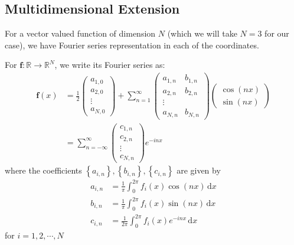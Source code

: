 \documentclass[a4paper]{article}
\theoremstyle{definition}
\newcommand{\dx}{\, \text{d} x}
\begin{document}
\subsection{Multidimensional Extension}
For a vector valued function of dimension $N$ (which we will take $N=3$ for our case), we have Fourier series representation in each of the coordinates.

For $\mathbf{f}:\mathbb{R} \rightarrow \mathbb{R}^N$, we write its Fourier series as:
\begin{align}
    \mathbf{f} (x) &= \frac{1}{2}
    \begin{pmatrix}
        a_{1,0} \\
        a_{2,0} \\
        \vdots \\
        a_{N,0}
    \end{pmatrix}
    + \sum_{n=1}^\infty
    \begin{pmatrix}
        a_{1,n} & b_{1,n} \\
        a_{2,n} & b_{2,n} \\
        \vdots \\
        a_{N,n} & b_{N,n}
    \end{pmatrix}
    \begin{pmatrix}
        \cos {\left( nx \right)} \\
        \sin {\left( nx \right)}
    \end{pmatrix}
    \\
    &= \sum_{n=-\infty}^{\infty}
    \begin{pmatrix}
        c_{1,n} \\
        c_{2,n} \\
        \vdots \\
        c_{N,n}
    \end{pmatrix}
    e^{-inx}
\end{align}
where the coefficients $\left\{ a_{i,n} \right\}, \left\{ b_{i,n} \right\}, \left\{ c_{i,n} \right\}$ are given by
\begin{align}
    a_{i,n} &= \frac{1}{\pi} \int_{0}^{2\pi} f_i (x) \cos {\left( nx \right)} \dx \\
    b_{i,n} &= \frac{1}{\pi} \int_{0}^{2\pi} f_i (x) \sin {\left( nx \right)} \dx \\
    c_{i,n} &= \frac{1}{2\pi} \int_{0}^{2\pi} f_i (x) e^{-inx} \dx
\end{align}
for $i=1, 2, \cdots, N$
\end{document}
